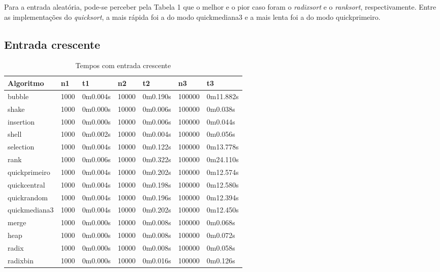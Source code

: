 \documentclass[
	article,			%
	11pt,				%
	oneside,			%
	a4paper,			%
	english,			%
	brazil,				%
	sumario=tradicional
	]{abntex2}
\begin{document}
Para a entrada aleatória, pode-se perceber pela Tabela 1 que o melhor e o pior caso foram o \emph{radixsort} e o \emph{ranksort}, respectivamente. Entre as implementações do \emph{quicksort}, a mais rápida foi a do modo quickmediana3 e a mais lenta foi a do modo quickprimeiro.

\subsection{Entrada crescente}

\begin{table}[!h]
\centering
\caption{Tempos com entrada crescente}
\label{my-label}
\begin{tabular}{|l|l|l|l|l|l|l|}
\hline
Algoritmo     & n1 & t1 & n2 & t2 & n3 & t3 \\ \hline
bubble        & 1000   & 0m0.004s   & 10000   & 0m0.190s   & 100000   & 0m11.882s   \\ \hline
shake         & 1000   & 0m0.000s   & 10000   & 0m0.006s   & 100000   & 0m0.038s   \\ \hline
insertion     & 1000   & 0m0.000s   & 10000   & 0m0.006s   & 100000   & 0m0.044s   \\ \hline
shell         & 1000   & 0m0.002s   & 10000   & 0m0.004s   & 100000   & 0m0.056s   \\ \hline
selection     & 1000   & 0m0.004s   & 10000   & 0m0.122s   & 100000   & 0m13.778s   \\ \hline
rank          & 1000   & 0m0.006s   & 10000   & 0m0.322s   & 100000   & 0m24.110s   \\ \hline
quickprimeiro & 1000   & 0m0.004s   & 10000   & 0m0.202s   & 100000   & 0m12.574s   \\ \hline
quickcentral  & 1000   & 0m0.004s   & 10000   & 0m0.198s   & 100000   & 0m12.580s   \\ \hline
quickrandom   & 1000   & 0m0.004s   & 10000   & 0m0.196s   & 100000   & 0m12.394s   \\ \hline
quickmediana3 & 1000   & 0m0.004s   & 10000   & 0m0.202s   & 100000   & 0m12.450s   \\ \hline
merge         & 1000   & 0m0.000s   & 10000   & 0m0.008s   & 100000   & 0m0.068s   \\ \hline
heap          & 1000   & 0m0.000s   & 10000   & 0m0.008s   & 100000   & 0m0.072s   \\ \hline
radix         & 1000   & 0m0.000s   & 10000   & 0m0.008s   & 100000   & 0m0.058s   \\ \hline
radixbin      & 1000   & 0m0.000s   & 10000   & 0m0.016s   & 100000   & 0m0.126s   \\ \hline
\end{tabular}
\end{table}
\end{document}
